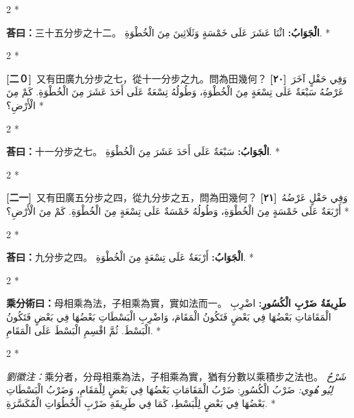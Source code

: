 \documentclass[11pt,a4paper]{article}
\newcommand{\ar}[1]{\arabicfont\beginR #1\endR}
\newcommand{\problemnum}[1]{\textbf{[\ignorespaces#1\unskip]}}
\newenvironment{bilingual}{%
  \begin{paracol}{2}%
  \switchcolumn[0]*%
}{%
  \end{paracol}%
}
\newcommand{\cnline}[1]{\switchcolumn[0]\noindent #1 \switchcolumn[1]}
\newcommand{\arline}[1]{\noindent\ar{#1} \switchcolumn[0]*}
\newenvironment{prob bilingual}{%
  \begin{paracol}{2}%
  \switchcolumn[0]*%
}{%
  \end{paracol}%
  \vspace{0.3em}%
}
\begin{document}
\begin{bilingual}
\cnline{\textcolor{answercolor}{\textbf{荅曰：}}三十五分步之十二。}
\arline{\textcolor{answercolor}{\textbf{الْجَوَابُ:}} اثْنَا عَشَرَ عَلَى خَمْسَةٍ وَثَلَاثِينَ مِنَ الْخُطْوَةِ.}
\end{bilingual}

\begin{bilingual}
\cnline{\problemnum{二０}\, 又有田廣九分步之七，從十一分步之九。問為田幾何？}
\arline{\problemnum{٢٠}\, وَفِي حَقْلٍ آخَرَ عَرْضُهُ سَبْعَةٌ عَلَى تِسْعَةٍ مِنَ الْخُطْوَةِ، وَطُولُهُ تِسْعَةٌ عَلَى أَحَدَ عَشَرَ مِنَ الْخُطْوَةِ. كَمْ مِنَ الْأَرْضِ؟}
\end{bilingual}

\begin{bilingual}
\cnline{\textcolor{answercolor}{\textbf{荅曰：}}十一分步之七。}
\arline{\textcolor{answercolor}{\textbf{الْجَوَابُ:}} سَبْعَةٌ عَلَى أَحَدَ عَشَرَ مِنَ الْخُطْوَةِ.}
\end{bilingual}

\begin{bilingual}
\cnline{\problemnum{二一}\, 又有田廣五分步之四，從九分步之五，問為田幾何？}
\arline{\problemnum{٢١}\, وَفِي حَقْلٍ عَرْضُهُ أَرْبَعَةٌ عَلَى خَمْسَةٍ مِنَ الْخُطْوَةِ، وَطُولُهُ خَمْسَةٌ عَلَى تِسْعَةٍ مِنَ الْخُطْوَةِ. كَمْ مِنَ الْأَرْضِ؟}
\end{bilingual}

\begin{bilingual}
\cnline{\textcolor{answercolor}{\textbf{荅曰：}}九分步之四。}
\arline{\textcolor{answercolor}{\textbf{الْجَوَابُ:}} أَرْبَعَةٌ عَلَى تِسْعَةٍ مِنَ الْخُطْوَةِ.}
\end{bilingual}

\begin{bilingual}
\cnline{%
\textcolor{methodcolor}{\textbf{乘分術曰：}}母相乘為法，子相乘為實，實如法而一。
}
\arline{%
\textcolor{methodcolor}{\textbf{طَرِيقَةُ ضَرْبِ الْكُسُورِ:}} اضْرِبِ الْمَقَامَاتِ بَعْضُهَا فِي بَعْضٍ فَتَكُونُ الْمَقَامَ، وَاضْرِبِ الْبَسْطَاتِ بَعْضُهَا فِي بَعْضٍ فَتَكُونُ الْبَسْطَ. ثُمَّ اقْسِمِ الْبَسْطَ عَلَى الْمَقَامِ.
}
\end{bilingual}

\begin{bilingual}
\cnline{%
\textcolor{commentarycolor}{\small\textit{劉徽注：}}乘分者，分母相乘為法，子相乘為實，猶有分數以乘積步之法也。
}
\arline{%
\textcolor{commentarycolor}{\small\textit{شَرْحُ لِيُو هُوِي:}} ضَرْبُ الْكُسُورِ: ضَرْبُ الْمَقَامَاتِ بَعْضُهَا فِي بَعْضٍ لِلْمَقَامِ، وَضَرْبُ الْبَسْطَاتِ بَعْضُهَا فِي بَعْضٍ لِلْبَسْطِ، كَمَا فِي طَرِيقَةِ ضَرْبِ الْخُطُوَاتِ الْمُكَسَّرَةِ.
}
\end{bilingual}
\end{document}
